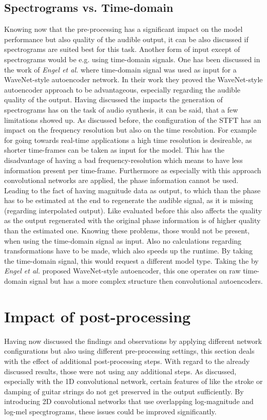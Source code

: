\subsection{Spectrograms vs. Time-domain}
Knowing now that the pre-processing has a significant impact on the model performance but also quality of the audible output, it can be also discussed if spectrograms are suited best for this task. Another form of input except of spectrograms would be e.g. using time-domain signals. One has been discussed in the work of \textit{Engel et al.} \cite{Engel2017} where time-domain signal was used as input for a WaveNet-style autoencoder network. In their work they proved the WaveNet-style autoencoder approach to be advantageous, especially regarding the audible quality of the output. Having discussed the impacts the generation of spectrograms has on the task of audio synthesis, it can be said, that a few limitations showed up. As discussed before, the configuration of the STFT has an impact on the frequency resolution but also on the time resolution. For example for going towards real-time applications a high time resolution is desireable, as shorter time-frames can be taken as input for the model. This has the disadvantage of having a bad frequency-resolution which means to have less information present per time-frame. Furthermore as especially with this approach convolutional networks are applied, the phase information cannot be used. Leading to the fact of having magnitude data as output, to which than the phase has to be estimated at the end to regenerate the audible signal, as it is missing (regarding interpolated output). Like evaluated before this also affects the quality as the output regenerated with the original phase information is of higher quality than the estimated one. Knowing these problems, those would not be present, when using the time-domain signal as input. Also no calculations regarding transformations have to be made, which also speeds up the runtime. By taking the time-domain signal, this would request a different model type. Taking the by \textit{Engel et al.} proposed WaveNet-style autoencoder, this one operates on raw time-domain signal but has a more complex structure then convolutional autoencoders.

\section{Impact of post-processing}
Having now discussed the findings and observations by applying different network configurations but also using different pre-processing settings, this section deals with the effect of additional post-processing steps. With regard to the already discussed results, those were not using any additional steps. As discussed, especially with the 1D convolutional network, certain features of like the stroke or damping of guitar strings do not get preserved in the output sufficiently. By introducing 2D convolutional networks that use overlapping log-magnitude and log-mel specgtrograms, these issues could be improved significantly. 


